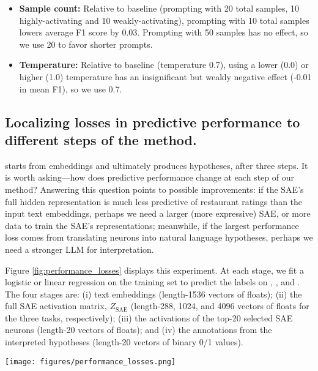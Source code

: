 \begin{itemize}
    \item \textbf{Sample count:} Relative to baseline (prompting with 20 total samples, 10 highly-activating and 10 weakly-activating), prompting with 10 total samples lowers average F1 score by 0.03. Prompting with 50 samples has no effect, so we use 20 to favor shorter prompts.
    
    \item \textbf{Temperature:} Relative to baseline (temperature 0.7), using a lower (0.0) or higher (1.0) temperature has an insignificant but weakly negative effect (-0.01 in mean F1), so we use 0.7.
\end{itemize}



\subsection{Localizing losses in predictive performance to different steps of the method.}
\label{sec:performance_losses}

\ourmethod starts from embeddings and ultimately produces hypotheses, after three steps. 
It is worth asking—how does predictive performance change at each step of our method?
Answering this question points to possible improvements: if the SAE's full hidden representation is much less predictive of restaurant ratings than the input text embeddings, perhaps we need a larger (more expressive) SAE, or more data to train the SAE's representations; meanwhile, if the largest performance loss comes from translating neurons into natural language hypotheses, perhaps we need a stronger LLM for interpretation.

Figure \ref{fig:performance_losses} displays this experiment. 
At each stage, we fit a logistic or linear regression on the training set to predict the labels on \headlines, \yelp, and \congress.
The four stages are: (i) text embeddings (length-1536 vectors of floats); (ii) the full SAE activation matrix, $Z_{\text{SAE}}$ (length-288, 1024, and 4096 vectors of floats for the three tasks, respectively); (iii) the activations of the top-20 selected SAE neurons (length-20 vectors of floats); and (iv) the annotations from the interpreted hypotheses (length-20 vectors of binary 0/1 values).

\begin{figure*}[!h]
\begin{center}
    \texttt{[image: figures/performance\_losses.png]}
\end{center}
    \caption{Performance losses at each step of the \ourmethod pipeline. 
    The leftmost point shows the performance of training a supervised single-layer model to predict the outcome using text embeddings; the second point shows the supervised performance using the full SAE representation; the third point shows the supervised performance using the top-20 SAE neurons; the rightmost point shows the supervised performance using the top-20 hypothesis annotations after neuron interpretation. 
    }
    \label{fig:performance_losses}
\end{figure*}

